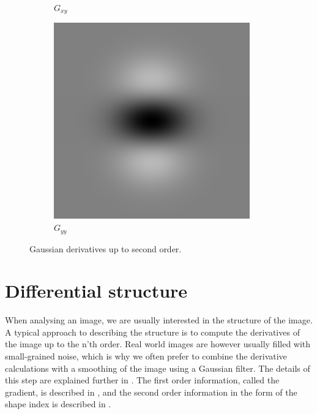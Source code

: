 \documentclass[thesis.tex]{subfiles}
\begin{document}
\begin{figure}[p]
\begin{subfigure}[t]{0.23\textwidth}
		\caption*{$G_{x y}$}
	\end{subfigure}
	\begin{subfigure}[t]{0.23\textwidth}
		\includegraphics[width=\textwidth]{img/gaussianDerivative_0_2.png}
		\caption*{$G_{yy}$}
	\end{subfigure}
	\caption{Gaussian derivatives up to second order.}
	\label{fig:gaussianDerivatives}
\end{figure}

\section{Differential structure}
\label{sec:diffStructure}
When analysing an image, we are usually interested in the structure of the image. A typical approach to describing the structure is to compute the derivatives of the image up to the n'th order. Real world images are however usually filled with small-grained noise, which is why we often prefer to combine the derivative calculations with a smoothing of the image using a Gaussian filter. The details of this step are explained further in . The first order information, called the gradient, is described in , and the second order information in the form of the shape index is described in .
\end{document}
